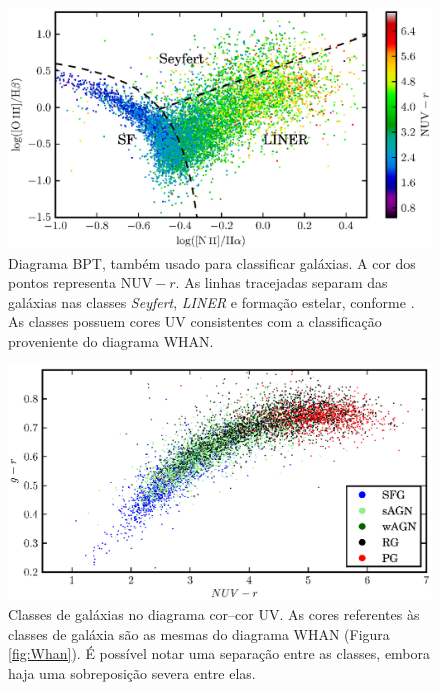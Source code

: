 \begin{figure}
	\includegraphics{figuras/bpt-uv.eps}
	\caption[Cores UV no diagrama BPT.]
	{Diagrama BPT, também usado para classificar galáxias. A cor dos
	pontos representa $\mathrm{NUV}-r$. As linhas tracejadas separam das galáxias nas
	classes {\em Seyfert}, {\em LINER} e formação estelar, conforme
	\citet[linhas S06 e K06 da tabela 1]{CidFernandes2010}. As classes possuem
	cores UV consistentes com a classificação proveniente do diagrama WHAN.}
	\label{fig:BPTUV}
\end{figure}

\begin{figure}
	\includegraphics{figuras/uvcolor-color-class.eps}
	\caption[Diagrama cor--cor UV de acordo com o tipo de galáxia.]
	{Classes de galáxias no diagrama cor--cor UV. As cores referentes às classes de
	galáxia são as mesmas do diagrama WHAN (Figura \ref{fig:Whan}). É possível
	notar uma separação entre as classes, embora haja uma sobreposição severa
	entre elas.}
	\label{fig:ColorClass}
\end{figure}


